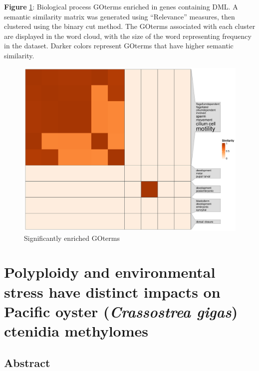 \documentclass [11pt, proquest] {uwthesis}[2015/03/03]
\begin{document}
\textbf{Figure} \ref{fig:simplifyEnrichment}: Biological process GOterms enriched in genes containing DML. A semantic similarity matrix was generated using ``Relevance'' measures, then clustered using the binary cut method. The GOterms associated with each cluster are displayed in the word cloud, with the size of the word representing frequency in the dataset. Darker colors represent GOterms that have higher semantic similarity.\newline 
\begin{figure}[h]
\centering
  \includegraphics[width=1\textwidth]{figure/Ch3/Figure3.5.pdf}
  \caption{Significantly enriched GOterms}
  \label{fig:simplifyEnrichment}
\end{figure}
\clearpage

\hypertarget{polyploidy-and-environmental-stress-have-distinct-impacts-on-pacific-oyster-crassostrea-gigas-ctenidia-methylomes}{%
\chapter{\texorpdfstring{Polyploidy and environmental stress have distinct impacts on Pacific oyster (\emph{Crassostrea gigas}) ctenidia methylomes}{Polyploidy and environmental stress have distinct impacts on Pacific oyster (Crassostrea gigas) ctenidia methylomes}}\label{polyploidy-and-environmental-stress-have-distinct-impacts-on-pacific-oyster-crassostrea-gigas-ctenidia-methylomes}}

\hypertarget{abstract-3}{%
\section{Abstract}\label{abstract-3}}
\end{document}
